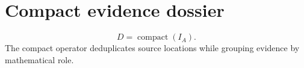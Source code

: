 \documentclass{article}
\begin{document}
\section*{Compact evidence dossier}
\label{dataset:init-evidence-dossier}
\[
D=\operatorname{compact}(I_A).
\]
The compact operator deduplicates source locations while grouping evidence by mathematical role.
\end{document}

